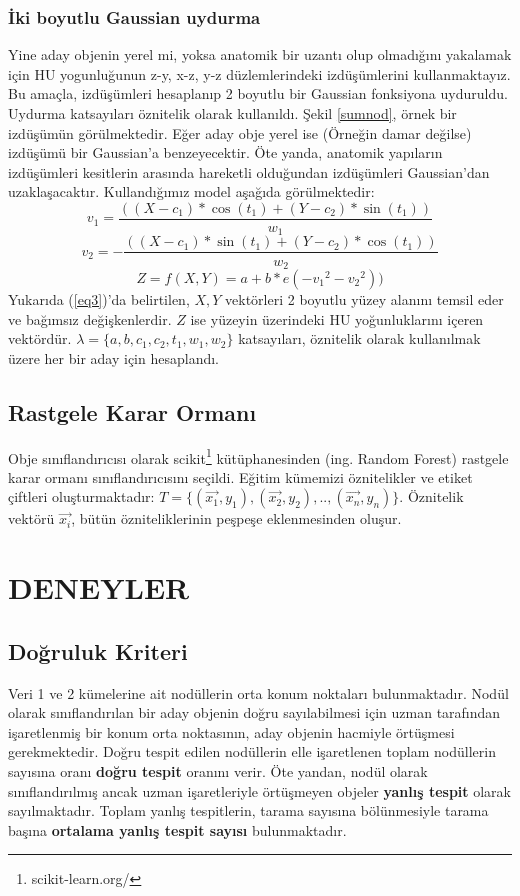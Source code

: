 \documentclass[conference]{IEEEtran}
\begin{document}
\subsubsection{İki boyutlu Gaussian uydurma}
Yine aday objenin yerel mi, yoksa anatomik bir uzantı olup olmadığını yakalamak için HU yogunluğunun z-y, x-z, y-z düzlemlerindeki izdüşümlerini kullanmaktayız. Bu amaçla, izdüşümleri hesaplanıp 2 boyutlu bir Gaussian fonksiyona uyduruldu. Uydurma katsayıları öznitelik olarak kullanıldı. Şekil \ref{sumnod}, örnek bir izdüşümün görülmektedir. Eğer aday obje yerel ise (Örneğin damar değilse) izdüşümü bir Gaussian'a benzeyecektir. Öte yanda, anatomik yapıların izdüşümleri kesitlerin arasında hareketli olduğundan izdüşümleri Gaussian'dan uzaklaşacaktır. 
Kullandığımız model aşağıda görülmektedir: 
\begin{equation}
v_1 = \frac{((X-c_1) * \cos(t_1) + (Y-c_2) * \sin(t_1))}{w_1}
\label{eq1}
\end{equation}
\begin{equation}
v_2 = -\frac{((X-c_1) * \sin(t_1) + (Y-c_2) * \cos(t_1))}{w_2}
\label{eq2}
\end{equation}
\begin{equation}
Z = f(X, Y) = a + b * e({-v_1}^2 - {v_2}^2))
\label{eq3}
\end{equation}
Yukarıda (\ref{eq3})'da belirtilen, $X, Y$ vektörleri 2 boyutlu yüzey alanını temsil eder ve bağımsız değişkenlerdir. $Z$ ise yüzeyin üzerindeki HU yoğunluklarını içeren vektördür. $\lambda = \lbrace a, b, c_1, c_2, t_1, w_1, w_2 \rbrace$ katsayıları, öznitelik olarak kullanılmak üzere her bir aday için hesaplandı.

\subsection{Rastgele Karar Ormanı}
Obje sınıflandırıcısı olarak scikit\footnote{scikit-learn.org/} kütüphanesinden (ing. Random Forest) rastgele karar ormanı sınıflandırıcısını seçildi. Eğitim kümemizi öznitelikler ve etiket çiftleri oluşturmaktadır: $T = \lbrace (\vec{x_1}, y_1), (\vec{x_2}, y_2), .., (\vec{x_n}, y_n) \rbrace$. Öznitelik vektörü $\vec{x_i}$, bütün özniteliklerinin peşpeşe eklenmesinden oluşur.

\section{DENEYLER}

\subsection{Doğruluk Kriteri}
Veri 1 ve 2 kümelerine ait nodüllerin orta konum noktaları bulunmaktadır. Nodül olarak sınıflandırılan bir aday objenin doğru sayılabilmesi için uzman tarafından işaretlenmiş bir konum orta noktasının, aday objenin hacmiyle örtüşmesi gerekmektedir. Doğru tespit edilen nodüllerin elle işaretlenen toplam nodüllerin sayısına oranı \textbf{doğru tespit} oranını verir. Öte yandan, nodül olarak sınıflandırılmış ancak uzman işaretleriyle örtüşmeyen objeler \textbf{yanlış tespit} olarak sayılmaktadır. Toplam yanlış tespitlerin, tarama sayısına bölünmesiyle tarama başına \textbf{ortalama yanlış tespit sayısı} bulunmaktadır.
\end{document}
